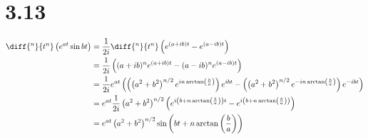\documentclass[10pt]{mypackage}
\begin{document}
\section{3.13}%
\begin{align*}
  \diff{^n}{t^n}\left(e^{at}\sin bt\right) &= \frac{1}{2i}\diff{^n}{t^n}\left(e^{\left(a + ib\right)t} - e^{\left(a - ib\right)t}\right)\\
                                           &= \frac{1}{2i}\left((a + ib)^{n}e^{\left(a + ib\right)t} - (a - ib)^{n}e^{\left(a - ib\right)t}\right)\\
                                           &= \frac{1}{2i}e^{at}\left(\left(\left(a^2 + b^2\right)^{n/2}e^{in\arctan\left(\frac{b}{a}\right)}\right)e^{ibt} - \left(\left(a^2 + b^2\right)^{n/2}e^{-in\arctan\left(\frac{b}{a}\right)}\right)e^{-ibt}\right)\\
                                           &= e^{at}\frac{1}{2i}\left(a^2 + b^2\right)^{n/2}\left(e^{i\left(b + n\arctan\left(\frac{b}{a}\right)\right)t} - e^{i\left(b + n\arctan\left(\frac{b}{a}\right)\right)}\right)\\
                                           &= e^{at}\left(a^2 + b^2\right)^{n/2}\sin\left(bt + n\arctan\left(\frac{b}{a}\right)\right)
\end{align*}
\end{document}
